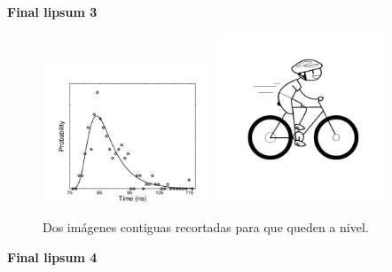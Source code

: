 \documentclass{article}
\begin{document}
\lipsum

{\bf Final lipsum 3}

\begin{figure}
    \centering
    \includegraphics[trim= 0mm 0mm 0mm 30mm,clip,angle=0,width=0.45\textwidth]{graficos/fig_9Vis.pdf}
    \includegraphics[trim= 0mm 15mm 0mm 5mm,clip,width=0.45\textwidth]{graficos/ciclista.png}
    \caption{Dos imágenes contiguas recortadas para que queden a nivel.}
    \label{fig:3}
\end{figure}

\lipsum

{\bf Final lipsum 4}
\end{document}
